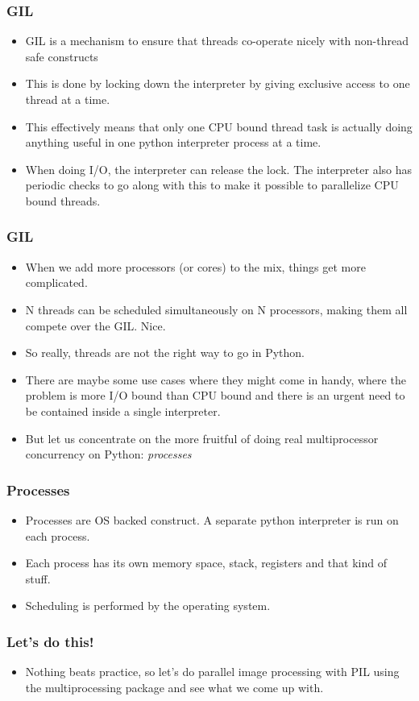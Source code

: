 \documentclass[13pt,xcolor=dvipsnames]{beamer}
\begin{document}
\begin{frame}
    \frametitle{GIL}
    \begin{itemize}
        \item GIL is a mechanism to ensure that threads co-operate nicely with non-thread safe constructs 
        \pause
        \item This is done by locking down the interpreter by giving exclusive access to one thread at a time.
        \pause
        \item This effectively means that only one CPU bound thread task is actually doing anything useful in one
            python interpreter process at a time.
        \pause
        \item When doing I/O, the interpreter can release the lock. The interpreter also has periodic checks to go along
            with this to make it possible to parallelize CPU bound threads.
    \end{itemize}
\end{frame}

\begin{frame}
    \frametitle{GIL}
    \begin{itemize}
        \item When we add more processors (or cores) to the mix, things get more complicated.
        \pause
        \item N threads can be scheduled simultaneously on N processors, making them all compete over the GIL. Nice.
        \pause
        \item So really, threads are not the right way to go in Python.
        \pause
        \item There are maybe some use cases where they might come in handy, where the problem is more I/O bound than CPU
            bound and there is an urgent need to be contained inside a single interpreter.
        \pause
        \item But let us concentrate on the more fruitful of doing real multiprocessor concurrency on Python: \emph{processes}
    \end{itemize}
\end{frame}

\begin{frame}
    \frametitle{Processes}
    \begin{itemize}
        \item Processes are OS backed construct. A separate python interpreter is run on each process.
        \pause
        \item Each process has its own memory space, stack, registers and that kind of stuff.
        \pause
        \item Scheduling is performed by the operating system.
    \end{itemize}
\end{frame}

\begin{frame}
    \frametitle{Let's do this!}
    \begin{itemize}
        \item Nothing beats practice, so let's do parallel image processing with PIL using the multiprocessing package
            and see what we come up with. 
    \end{itemize}
\end{frame}
\end{document}
